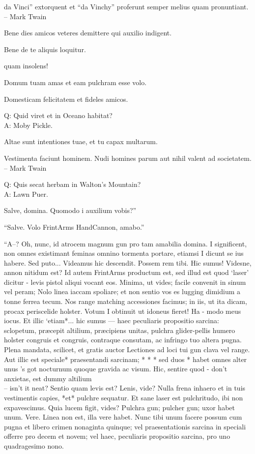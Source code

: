 \documentclass[titlepage,12pt]{memoir}
\begin{document}
da Vinci” extorquent et “da Vinchy” proferunt
semper melius quam pronuntiant.
\\-- Mark Twain

Bene dies amicos veteres demittere qui auxilio indigent.

 Bene de te aliquis loquitur.

quam insolens!

Domum tuam amas et eam pulchram esse volo.

 Domesticam felicitatem et fideles amicos.

Q: Quid viret et in Oceano habitat?\\
A: Moby Pickle.

Altae sunt intentiones tuae, et tu capax multarum.

Vestimenta faciunt hominem. Nudi homines parum aut nihil valent ad societatem.
\\-- Mark Twain

Q: Quis secat herbam in Walton’s Mountain?\\
A: Lawn Puer.

Salve, domina. Quomodo i auxilium vobis?”

“Salve. Volo FrintArms HandCannon, amabo.”

“A--? Oh, nunc, id atrocem magnum gun pro tam amabilia domina. I
significent, non omnes existimant feminas omnino tormenta portare, etiamsi I
dicunt se ius habere. Sed puto... Videamus
hic descendit. Possem rem tibi. Hic sumus!
Videsne, annon nitidum est? Id autem FrintArms productum est,
sed illud est quod ‘laser’ dicitur - levis pistol aliqui vocant
eos. Minima, ut vides; facile convenit in sinum vel peram; Nolo
linea iaccam spoliare; et non sentio vos es lugging dimidium a
tonne ferrea tecum. Nos range matching accessiones facimus;
in iis, ut ita dicam, procax periscelide holster. Votum I
obtinuit ut idoneus fieret! Ha - modo meus iocus. Et
illic ‘etiam*... hic sumus — haec peculiaris propositio sarcina: sclopetum,
præcepit altilium, præcipiens unitas, pulchra glider-pellis humero holster
congruis et congruis, contraque consutam, ac infringo tuo
altera pugna. Plena mandata, scilicet, et gratis auctor
Lectiones ad loci tui gun clava vel range. Aut illic est speciale*
praesentandi sarcinam; * * * sed duos * habet omnes alter unus ’s got
nocturnum quoque gravida ac visum. Hic, sentire quod - don’t
anxietas, est dummy altilium \\-- isn’t it neat? Sentio quam levis est?
Lenis, vide? Nulla frena inhaero et in tuis vestimentis capies, *et*
pulchre sequatur. Et sane laser est pulchritudo, ibi
non expavescimus. Quia lucem figit, vides? Pulchra gun;
pulcher gun; uxor habet unum. Vere. Linea non est, illa
vere habet. Nunc tibi unum facere possum cum pugna et libero
crimen nonaginta quinque; vel praesentationis sarcina in speciali
offerre pro decem et novem; vel haec, peculiaris propositio sarcina, pro
uno quadragesimo nono.
\end{document}
